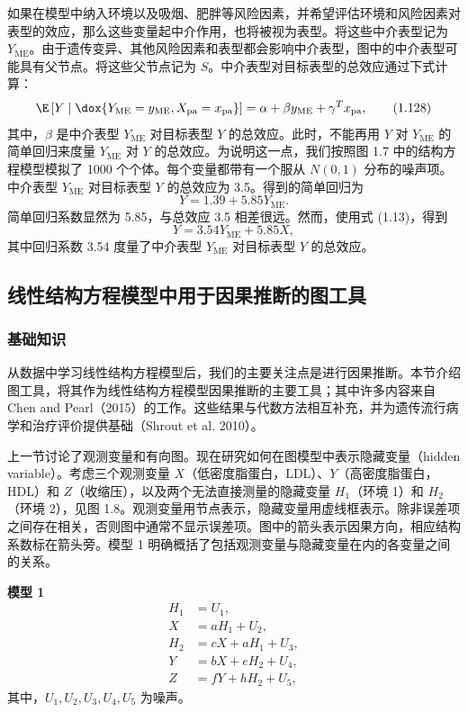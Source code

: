 如果在模型中纳入环境以及吸烟、肥胖等风险因素，并希望评估环境和风险因素对表型的效应，那么这些变量起中介作用，也将被视为表型。将这些中介表型记为 $Y_{\mathrm{ME}}$。由于遗传变异、其他风险因素和表型都会影响中介表型，图中的中介表型可能具有父节点。将这些父节点记为 $S$。中介表型对目标表型的总效应通过下式计算：
\begin{equation}
\E\left[Y\mid\dox{Y_{\mathrm{ME}}=y_{\mathrm{ME}},X_{\mathrm{pa}}=x_{\mathrm{pa}}}\right]
=\alpha+\beta y_{\mathrm{ME}}+\gamma^Tx_{\mathrm{pa}},
\tag{1.128}
\end{equation}
其中，$\beta$ 是中介表型 $Y_{\mathrm{ME}}$ 对目标表型 $Y$ 的总效应。此时，不能再用 $Y$ 对 $Y_{\mathrm{ME}}$ 的简单回归来度量 $Y_{\mathrm{ME}}$ 对 $Y$ 的总效应。为说明这一点，我们按照图 1.7 中的结构方程模型模拟了 1000 个个体。每个变量都带有一个服从 $N(0,1)$ 分布的噪声项。中介表型 $Y_{\mathrm{ME}}$ 对目标表型 $Y$ 的总效应为 3.5。得到的简单回归为
\[
Y=1.39+5.85Y_{\mathrm{ME}}.
\]
简单回归系数显然为 5.85，与总效应 3.5 相差很远。然而，使用式 (1.13)，得到
\[
Y=3.54Y_{\mathrm{ME}}+5.85X,
\]
其中回归系数 3.54 度量了中介表型 $Y_{\mathrm{ME}}$ 对目标表型 $Y$ 的总效应。


\FloatBarrier

\subsection{线性结构方程模型中用于因果推断的图工具}
\subsubsection{基础知识}

从数据中学习线性结构方程模型后，我们的主要关注点是进行因果推断。本节介绍图工具，将其作为线性结构方程模型因果推断的主要工具；其中许多内容来自 Chen and Pearl（2015）的工作。这些结果与代数方法相互补充，并为遗传流行病学和治疗评价提供基础（Shrout et al. 2010）。

上一节讨论了观测变量和有向图。现在研究如何在图模型中表示隐藏变量（hidden variable）。考虑三个观测变量 $X$（低密度脂蛋白，LDL）、$Y$（高密度脂蛋白，HDL）和 $Z$（收缩压），以及两个无法直接测量的隐藏变量 $H_1$（环境 1）和 $H_2$（环境 2），见图 1.8。观测变量用节点表示，隐藏变量用虚线框表示。除非误差项之间存在相关，否则图中通常不显示误差项。图中的箭头表示因果方向，相应结构系数标在箭头旁。模型 1 明确概括了包括观测变量与隐藏变量在内的各变量之间的关系。



\noindent\textbf{模型 1}
\[
\begin{aligned}
H_1&=U_1,\\
X&=aH_1+U_2,\\
H_2&=cX+aH_1+U_3,\\
Y&=bX+eH_2+U_4,\\
Z&=fY+hH_2+U_5,
\end{aligned}
\]
其中，$U_1,U_2,U_3,U_4,U_5$ 为噪声。

